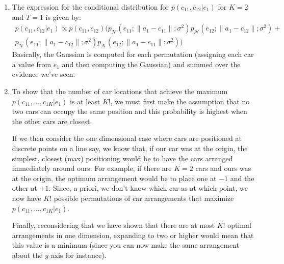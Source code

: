 \documentclass[12pt]{article}
\begin{document}
\begin{enumerate}[label=(\alph*)]
	\item The expression for the conditional distribution for \(p(c_{11}, c_{12} | e_1)\)
		for \(K=2\) and \(T=1\) is given by:
		\begin{multline*}
			p(c_{11}, c_{12} | e_1) \propto p(c_{11}, c_{12})(
				p_{\mathcal{N}} (e_{11}; \lVert a_1 - c_{11} \rVert; \sigma^2)
				p_{\mathcal{N}} (e_{12}; \lVert a_1 - c_{12} \rVert; \sigma^2) + \\
				p_{\mathcal{N}} (e_{11}; \lVert a_1 - c_{12} \rVert; \sigma^2)
				p_{\mathcal{N}} (e_{12}; \lVert a_1 - c_{11} \rVert; \sigma^2)
			)
		\end{multline*}
		Basically, the Gaussian is computed for each permutation (assigning each car
		a value from \(e_1\) and then computing the Gaussian) and summed over
		the evidence we've seen.

	\item To show that the number of car locations that achieve the maximum
		\(p(c_{11},..., c_{1K} | e_1)\) is at least \(K!\), we must first make the
		assumption that no two cars can occupy the same position and this probability
		is highest when the other cars are closest.

		If we then consider the one dimensional case where cars are positioned at discrete points
		on a line say, we know that, if our car was at the origin, the simplest, closest
		(max) positioning would be to have the cars arranged immediately around ours. For
		example, if there are \(K=2\) cars and ours was at the origin, the optimum
		arrangement would be to place one at \(-1\) and the other at \(+1\). Since, a priori,
		we don't know which car as at which point, we now have \(K!\) possible permutations
		of car arrangements that maximize \(p(c_{11},..., c_{1K} | e_1)\).

		Finally, reconsidering that we have shown that there are at most \(K!\) optimal
		arrangements in one dimension, expanding to two or higher would mean that
		this value is a minimum (since you can now make the same arrangement about the \(y\)
		axis for instance).

\end{enumerate}
\end{document}
